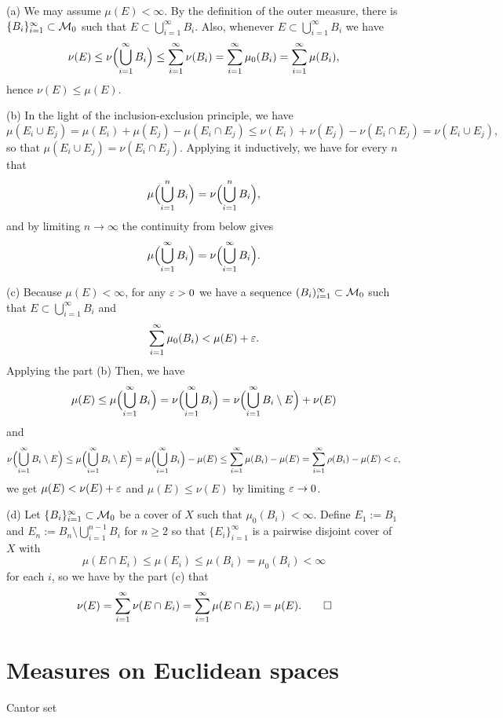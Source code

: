 \documentclass{../../large}
\begin{document}
\begin{pf}
(a)
We may assume $\mu(E)<\infty$.
By the definition of the outer measure, there is $\{B_i\}_{i=1}^\infty\subset\mathcal{M}_0$ such that $E\subset\bigcup_{i=1}^\infty B_i$.
Also, whenever $E\subset\bigcup_{i=1}^\infty B_i$ we have
\[\nu(E)\le\nu\Bigl(\bigcup_{i=1}^\infty B_i\Bigr)\le\sum_{i=1}^\infty\nu(B_i)=\sum_{i=1}^\infty\mu_0(B_i)=\sum_{i=1}^\infty\mu(B_i),\]
hence $\nu(E)\le\mu(E)$.

(b)
In the light of the inclusion-exclusion principle, we have
\[\mu(E_i\cup E_j)=\mu(E_i)+\mu(E_j)-\mu(E_i\cap E_j)\le\nu(E_i)+\nu(E_j)-\nu(E_i\cap E_j)=\nu(E_i\cup E_j),\]
so that $\mu(E_i\cup E_j)=\nu(E_i\cap E_j)$.
Applying it inductively, we have for every $n$ that
\[\mu\Bigl(\bigcup_{i=1}^nB_i\Bigr)=\nu\Bigl(\bigcup_{i=1}^nB_i\Bigr),\]
and by limiting $n\to\infty$ the continuity from below gives
\[\mu\Bigl(\bigcup_{i=1}^\infty B_i\Bigr)=\nu\Bigl(\bigcup_{i=1}^\infty B_i\Bigr).\]

(c)
Because $\mu(E)<\infty$, for any $\varepsilon>0$ we have a sequence $(B_i)_{i=1}^\infty\subset\mathcal{M}_0$ such that $E\subset\bigcup_{i=1}^\infty B_i$ and
\[\sum_{i=1}^\infty\mu_0(B_i)<\mu(E)+\varepsilon.\]
Applying the part (b) 
Then, we have
\[\mu(E)\le\mu\Bigl(\bigcup_{i=1}^\infty B_i\Bigr)=\nu\Bigl(\bigcup_{i=1}^\infty B_i\Bigr)=\nu\Bigl(\bigcup_{i=1}^\infty B_i\setminus E\Bigr)+\nu(E)\]
and
\[\nu\Bigl(\bigcup_{i=1}^\infty B_i\setminus E\Bigr)
\le\mu\Bigl(\bigcup_{i=1}^\infty B_i\setminus E\Bigr)
=\mu\Bigl(\bigcup_{i=1}^\infty B_i\Bigr)-\mu(E)
\le\sum_{i=1}^\infty\mu(B_i)-\mu(E)=\sum_{i=1}^\infty\rho(B_i)-\mu(E)<\varepsilon,\]
we get $\mu(E)<\nu(E)+\varepsilon$ and $\mu(E)\le\nu(E)$ by limiting $\varepsilon\to0$.

(d)
Let $\{B_i\}_{i=1}^\infty\subset\mathcal{M}_0$ be a cover of $X$ such that $\mu_0(B_i)<\infty$.
Define $E_1:=B_1$ and $E_n:=B_n\setminus\bigcup_{i=1}^{n-1}B_i$ for $n\ge2$ so that $\{E_i\}_{i=1}^\infty$ is a pairwise disjoint cover of $X$ with
\[\mu(E\cap E_i)\le\mu(E_i)\le\mu(B_i)=\mu_0(B_i)<\infty\]
for each $i$, so we have by the part (c) that
\[\nu(E)=\sum_{i=1}^\infty\nu(E\cap E_i)=\sum_{i=1}^\infty\mu(E\cap E_i)=\mu(E).\qedhere\]
\end{pf}


\section{Measures on Euclidean spaces}

Cantor set

\begin{prb}
\end{prb}
\end{document}
